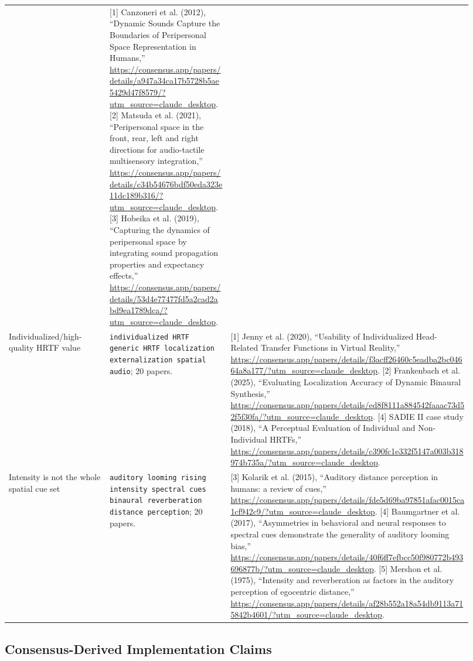 \begin{longtable}{P{0.20\linewidth} P{0.24\linewidth} P{0.48\linewidth}}
& [1] Canzoneri et al. (2012), ``Dynamic Sounds Capture the Boundaries of Peripersonal Space Representation in Humans,'' \url{https://consensus.app/papers/details/a947a34ca17b5728b5ae5429d47f8579/?utm_source=claude_desktop}. [2] Matsuda et al. (2021), ``Peripersonal space in the front, rear, left and right directions for audio-tactile multisensory integration,'' \url{https://consensus.app/papers/details/c34b54676bdf50eda323e11dc189b316/?utm_source=claude_desktop}. [3] Hobeika et al. (2019), ``Capturing the dynamics of peripersonal space by integrating sound propagation properties and expectancy effects,'' \url{https://consensus.app/papers/details/53d4e77477fd5a2cad2abd9ea1789dca/?utm_source=claude_desktop}.\\
\addlinespace
Individualized/high-quality HRTF value
& \texttt{individualized HRTF generic HRTF localization externalization spatial audio}; 20 papers.
& [1] Jenny et al. (2020), ``Usability of Individualized Head-Related Transfer Functions in Virtual Reality,'' \url{https://consensus.app/papers/details/f3acff26460c5eadba2bc04664a8a177/?utm_source=claude_desktop}. [2] Frankenbach et al. (2025), ``Evaluating Localization Accuracy of Dynamic Binaural Synthesis,'' \url{https://consensus.app/papers/details/ed8f8111a884542faaac73d52f5f30fa/?utm_source=claude_desktop}. [4] SADIE II case study (2018), ``A Perceptual Evaluation of Individual and Non-Individual HRTFs,'' \url{https://consensus.app/papers/details/c390fc1e332f5147a003b318974b735a/?utm_source=claude_desktop}.\\
\addlinespace
Intensity is not the whole spatial cue set
& \texttt{auditory looming rising intensity spectral cues binaural reverberation distance perception}; 20 papers.
& [3] Kolarik et al. (2015), ``Auditory distance perception in humans: a review of cues,'' \url{https://consensus.app/papers/details/fde5d69ba97851afac0015ca1cf942c9/?utm_source=claude_desktop}. [4] Baumgartner et al. (2017), ``Asymmetries in behavioral and neural responses to spectral cues demonstrate the generality of auditory looming bias,'' \url{https://consensus.app/papers/details/40f6ff7efbcc50f980772b493696877b/?utm_source=claude_desktop}. [5] Mershon et al. (1975), ``Intensity and reverberation as factors in the auditory perception of egocentric distance,'' \url{https://consensus.app/papers/details/af28b552a18a54db9113a715842b4601/?utm_source=claude_desktop}.\\
\bottomrule
\end{longtable}

\subsection*{Consensus-Derived Implementation Claims}

